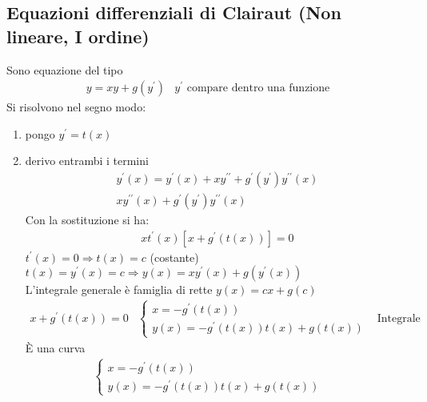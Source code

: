 \documentclass{book}
\begin{document}
\subsection{Equazioni differenziali di Clairaut (Non lineare, I ordine)}
Sono equazione del tipo
\begin{eqnarray*}
	y=xy+g(y^\prime) &y^\prime \text{ compare dentro una funzione}
\end{eqnarray*}
Si risolvono nel segno modo:
\begin{enumerate}
	\item pongo $y^\prime =t(x)$ 
	\item derivo entrambi i termini 
		\begin{eqnarray*}
			y^\prime(x)=y^\prime(x)+xy^{\prime\prime}+g^\prime (y^\prime)
			y^{\prime\prime}(x)\\
			xy^{\prime\prime}(x)+g^\prime(y^\prime)y^{\prime\prime}(x)
		\end{eqnarray*}
		Con la sostituzione si ha:
		\begin{eqnarray*}
			xt^\prime(x)[x+g^\prime(t(x))] =0
		\end{eqnarray*}
		$t^\prime(x)=0\Rightarrow t(x)=c$ (costante)
		$t(x)=y^\prime(x)=c\Rightarrow y(x)=xy^\prime(x)+g(y^\prime(x))$\\
		L'integrale generale è famiglia di rette $y(x)=cx+g(c)$
		\begin{eqnarray*}
			x+g^{\prime}(t(x))=0 & \begin{cases}
				x=-g^\prime(t(x))\\
				y(x)=-g^\prime(t(x))t(x)+g(t(x))
			\end{cases} & \text{Integrale singolare}
		\end{eqnarray*}
		È una curva
		\begin{eqnarray*}
			\begin{cases}
				x=-g^\prime(t(x))\\
				y(x)=-g^\prime(t(x))t(x)+g(t(x))
			\end{cases} & \begin{matrix}
				
			\end{matrix}
		\end{eqnarray*}
\end{enumerate}


\printindex
\end{document}
